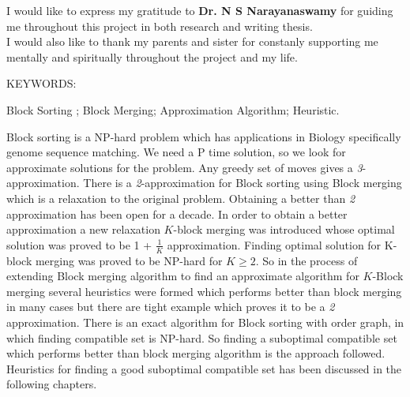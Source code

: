 \documentclass[BTech]{iitmdiss}
\begin{document}
\acknowledgements

I would like to express my gratitude to \textbf{Dr. N S Narayanaswamy} for guiding me throughout this project in both research and writing thesis. \\
I would also like to thank my parents and sister for constanly supporting me mentally and spiritually throughout the project and my life.


\abstract

\noindent KEYWORDS: \hspace*{0.5em} \parbox[t]{4.4in}{Block Sorting ; Block Merging;
  Approximation Algorithm; Heuristic.}

\vspace*{24pt}

\noindent Block sorting is a NP-hard problem which has applications in Biology specifically genome sequence matching. We need a P time solution, so we look for approximate solutions for the problem. Any greedy set of moves gives a \textit{3}-approximation. There is a \textit{2}-approximation for Block sorting using Block merging which is a relaxation to the original problem. Obtaining a better than \textit{2} approximation has been open for a decade. In order to obtain a better approximation a new relaxation $K$-block merging was introduced whose optimal solution was proved to be 1 + $\frac{1}{K}$ approximation. Finding optimal solution for K-block merging was proved to be NP-hard for $K\geq 2$. So in the process of extending Block merging algorithm to find an approximate algorithm for $K$-Block merging several heuristics were formed which performs better than block merging in many cases but there are tight example which proves it to be a \textit{2} approximation. There is an exact algorithm for Block sorting with order graph, in which finding compatible set is NP-hard. So finding a suboptimal compatible set which performs better than block merging algorithm is the approach followed. Heuristics for finding a good suboptimal compatible set has been discussed in the following chapters.
\pagebreak


\begin{singlespace}
\tableofcontents
\thispagestyle{empty}

\listoftables
{}
\listoffigures
{}
\end{singlespace}
\end{document}
